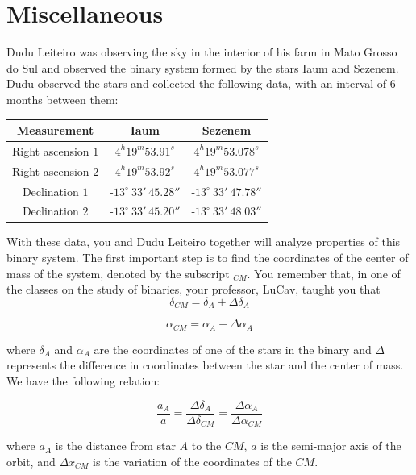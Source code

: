 \documentclass[11pt]{article}
\begin{document}
\section{Miscellaneous}
\begin{pproblem} 
    Dudu Leiteiro was observing the sky in the interior of his farm in Mato Grosso do Sul and observed the binary system formed by the stars Iaum and Sezenem. Dudu observed the stars and collected the following data, with an interval of 6 months between them:
    \\
    \begin{center}
        \begin{tabular}{|c|c|c|}
            \hline %
            Measurement & Iaum & Sezenem   \\ 
            \hline
            Right ascension \(1\) & \(4^h19^m53.91^s\) & \(4^h19^m53.078^s\) \\
            Right ascension \(2\) & \(4^h19^m53.92^s\) & \(4^h19^m53.077^s\) \\
            Declination \(1\) & -\(13^\circ \ 33' \ 45.28''\) & -\(13^\circ \ 33' \ 47.78''\) \\
            Declination \(2\) & -\(13^\circ \ 33' \ 45.20''\) & -\(13^\circ \ 33' \ 48.03''\) \\
            \hline
        \end{tabular} 
\end{center}
    With these data, you and Dudu Leiteiro together will analyze properties of this binary system. The first important step is to find the coordinates of the center of mass of the system, denoted by the subscript \(_{CM}\). You remember that, in one of the classes on the study of binaries, your professor, LuCav, taught you that
    \[
    \delta_{CM} = \delta_A + \Delta\delta_A
    \]

    \[
    \alpha_{CM} = \alpha_A + \Delta\alpha_A
    \]

    where \(\delta_A\) and \(\alpha_A\) are the coordinates of one of the stars in the binary and \(\Delta\) represents the difference in coordinates between the star and the center of mass. We have the following relation:

    \[
    \frac{a_A}{a} = \frac{\Delta\delta_A}{\Delta\delta_{CM}} = \frac{\Delta\alpha_A}{\Delta\alpha_{CM}}
    \]

    where \(a_A\) is the distance from star \(A\) to the \(CM\), \(a\) is the semi-major axis of the orbit, and \(\Delta x_{CM}\) is the variation of the coordinates of the \(CM\). 
    

\end{pproblem}
\end{document}
